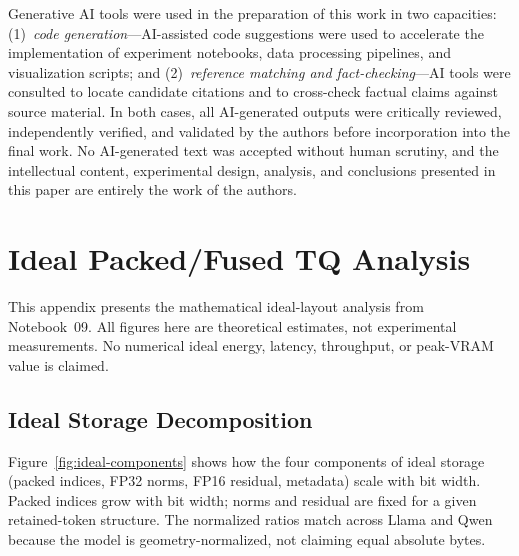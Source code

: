 \documentclass[sigconf,nonacm]{acmart}
\begin{document}
Generative AI tools were used in the preparation of this work in two
capacities: (1)~\emph{code generation}—AI-assisted code suggestions were
used to accelerate the implementation of experiment notebooks, data
processing pipelines, and visualization scripts; and (2)~\emph{reference
matching and fact-checking}—AI tools were consulted to locate candidate
citations and to cross-check factual claims against source material. In
both cases, all AI-generated outputs were critically reviewed,
independently verified, and validated by the authors before incorporation
into the final work. No AI-generated text was accepted without human
scrutiny, and the intellectual content, experimental design, analysis, and
conclusions presented in this paper are entirely the work of the authors.

\nocite{*}

\begingroup
\sloppy
{}

\endgroup

\clearpage  %
\appendix
\section{Ideal Packed/Fused TQ Analysis}
\label{app:ideal}

This appendix presents the mathematical ideal-layout analysis from Notebook~09.
All figures here are theoretical estimates, not experimental measurements. No numerical ideal
energy, latency, throughput, or peak-VRAM value is claimed.

\subsection{Ideal Storage Decomposition}

Figure~\ref{fig:ideal-components} shows how the four components of ideal storage
(packed indices, FP32 norms, FP16 residual, metadata) scale with bit width. Packed
indices grow with bit width; norms and residual are fixed for a given retained-token
structure. The normalized ratios match across Llama and Qwen because the model is
geometry-normalized, not claiming equal absolute bytes.
\end{document}
